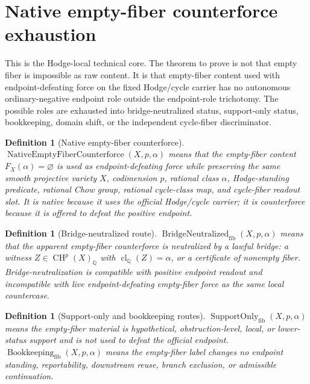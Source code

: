 \documentclass[11pt]{article}
\newtheorem{definition}[theorem]{Definition}
\newcommand{\QQ}{\mathbb{Q}}
\newcommand{\CH}{\operatorname{CH}}
\newcommand{\clQ}{\operatorname{cl}_{\QQ}}
\begin{document}
\section{Native empty-fiber counterforce exhaustion}

This is the Hodge-local technical core.  The theorem to prove is not that empty fiber is impossible as raw content.  It is that empty-fiber content used with endpoint-defeating force on the fixed Hodge/cycle carrier has no autonomous ordinary-negative endpoint role outside the endpoint-role trichotomy.  The possible roles are exhausted into bridge-neutralized status, support-only status, bookkeeping, domain shift, or the independent cycle-fiber discriminator.

\begin{definition}[Native empty-fiber counterforce]
$\operatorname{NativeEmptyFiberCounterforce}(X,p,\alpha)$ means that the empty-fiber content $F_X(\alpha)=\varnothing$ is used as endpoint-defeating force while preserving the same smooth projective variety $X$, codimension $p$, rational class $\alpha$, Hodge-standing predicate, rational Chow group, rational cycle-class map, and cycle-fiber readout slot.  It is native because it uses the official Hodge/cycle carrier; it is counterforce because it is offered to defeat the positive endpoint.
\end{definition}

\begin{definition}[Bridge-neutralized route]
$\operatorname{BridgeNeutralized}_{\mathrm{fib}}(X,p,\alpha)$ means that the apparent empty-fiber counterforce is neutralized by a lawful bridge: a witness $Z\in\CH^p(X)_\QQ$ with $\clQ(Z)=\alpha$, or a certificate of nonempty fiber.  Bridge-neutralization is compatible with positive endpoint readout and incompatible with live endpoint-defeating empty-fiber force as the same local countercase.
\end{definition}

\begin{definition}[Support-only and bookkeeping routes]
$\operatorname{SupportOnly}_{\mathrm{fib}}(X,p,\alpha)$ means the empty-fiber material is hypothetical, obstruction-level, local, or lower-status support and is not used to defeat the official endpoint.  $\operatorname{Bookkeeping}_{\mathrm{fib}}(X,p,\alpha)$ means the empty-fiber label changes no endpoint standing, reportability, downstream reuse, branch exclusion, or admissible continuation.
\end{definition}
\end{document}
